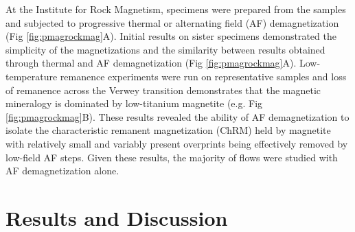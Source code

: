 \documentclass[draft,gc]{AGUTeX}
\begin{document}
\begin{article}
At the Institute for Rock Magnetism, specimens were prepared from the samples and subjected to progressive thermal or alternating field (AF) demagnetization (Fig \ref{fig:pmagrockmag}A). Initial results on sister specimens demonstrated the simplicity of the magnetizations and the similarity between results obtained through thermal and AF demagnetization (Fig \ref{fig:pmagrockmag}A). Low-temperature remanence experiments were run on representative samples and loss of remanence across the Verwey transition demonstrates that the magnetic mineralogy is dominated by low-titanium magnetite (e.g. Fig \ref{fig:pmagrockmag}B). These results revealed the ability of AF demagnetization to isolate the characteristic remanent magnetization (ChRM) held by magnetite with relatively small and variably present overprints being effectively removed by low-field AF steps. Given these results, the majority of flows were studied with AF demagnetization alone.


\section{Results and Discussion}


\end{article}
\end{document}
